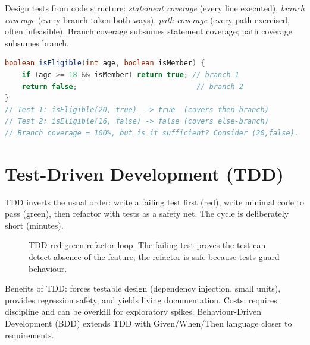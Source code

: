 Design tests from code structure: \emph{statement coverage} (every line executed), \emph{branch coverage} (every branch taken both ways), \emph{path coverage} (every path exercised, often infeasible). Branch coverage subsumes statement coverage; path coverage subsumes branch.

\begin{lstlisting}[language=Java,caption={Branch coverage: two tests cover both branches.}]
boolean isEligible(int age, boolean isMember) {
    if (age >= 18 && isMember) return true; // branch 1
    return false;                            // branch 2
}
// Test 1: isEligible(20, true)  -> true  (covers then-branch)
// Test 2: isEligible(16, false) -> false (covers else-branch)
// Branch coverage = 100%, but is it sufficient? Consider (20,false).
\end{lstlisting}

\section{Test-Driven Development (TDD)}

TDD inverts the usual order: write a failing test first (red), write minimal code to pass (green), then refactor with tests as a safety net. The cycle is deliberately short (minutes).

\begin{figure}[h]
\centering
{}
\caption{TDD red-green-refactor loop. The failing test proves the test can detect absence of the feature; the refactor is safe because tests guard behaviour.}
\end{figure}

Benefits of TDD: forces testable design (dependency injection, small units), provides regression safety, and yields living documentation. Costs: requires discipline and can be overkill for exploratory spikes. Behaviour-Driven Development (BDD) extends TDD with Given/When/Then language closer to requirements.


